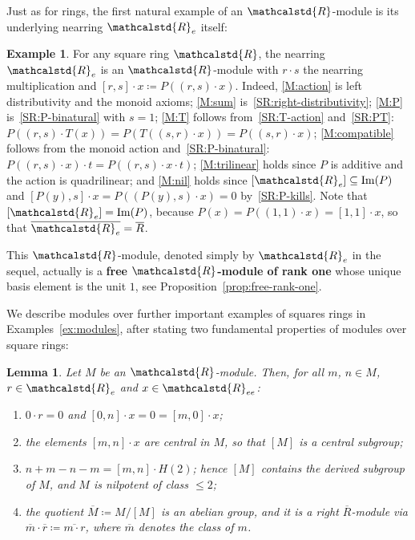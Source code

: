 \documentclass[reqno,a4paper]{amsart}
\theoremstyle{plain}
\newtheorem{lemma}[subsection]{Lemma}
\theoremstyle{definition}
\newtheorem{example}[subsection]{Example}
\newcommand{\defn}{\textbf}
\newcommand{\DefEq}{\coloneq}
\newcommand{\R}{\ensuremath{\mathcalstd{R}}}
\renewcommand{\Im}{\ensuremath{\mathrm{Im}}}
\renewcommand{\Re}{\ensuremath{\R_{e}}}
\newcommand{\Ree}{\ensuremath{\R_{ee}}}
\newcommand{\Rbar}{\ensuremath{\overline{R}}}
\newcommand{\brk}[2]{\ensuremath{[#1,#2]}}
\begin{document}
Just as for rings, the first natural example of an \(\R\)-module is its underlying nearring \(\R_e\) itself:

\begin{example}\label{ex:R_e}
  For any square ring \(\R\), the nearring \(\Re\) is an \(\R\)-module with \(r\cdot s\) the nearring multiplication and \(\brk{r}{s}\cdot x\DefEq P((r,s)\cdot x)\). Indeed, \ref{M:action} is left distributivity and the monoid axioms; \ref{M:sum} is~\ref{SR:right-distributivity}; \ref{M:P} is~\ref{SR:P-binatural} with \(s=1\); \ref{M:T} follows from~\ref{SR:T-action} and~\ref{SR:PT}: \(P((r,s)\cdot T(x))=P(T((s,r)\cdot x))=P((s,r)\cdot x)\); \ref{M:compatible} follows from the monoid action and~\ref{SR:P-binatural}: \(P((r,s)\cdot x)\cdot t=P((r,s)\cdot x\cdot t)\); \ref{M:trilinear} holds since \(P\) is additive and the action is quadrilinear; and \ref{M:nil} holds since \([\Re]\subseteq\Im(P)\) and \(\brk{P(y)}{s}\cdot x=P((P(y),s)\cdot x)=0\) by~\ref{SR:P-kills}. Note that \([\Re]=\Im(P)\), because \(P(x)=P((1,1)\cdot x)=\brk{1}{1}\cdot x\), so that \(\overline{\Re}=\Rbar\).

  This \(\R\)-module, denoted simply by \(\Re\) in the sequel, actually is a \defn{free \(\R\)-module of rank one} whose unique basis element is the unit \(1\), see Proposition~\ref{prop:free-rank-one}.
\end{example}

We describe modules over further important examples of squares rings in Examples~\ref{ex:modules}, after stating two fundamental properties of modules over square rings:

\begin{lemma}\label{lem:module-basic}
  Let \(M\) be an \(\R\)-module. Then, for all \(m\), \(n\in M\), \(r\in\Re\) and \(x\in\Ree\):
  \begin{enumerate}
    \item\label{it:zero} \(0\cdot r=0\) and \(\brk{0}{n}\cdot x=0=\brk{m}{0}\cdot x\);
    \item\label{it:central} the elements \(\brk{m}{n}\cdot x\) are central in \(M\), so that \([M]\) is a central subgroup;
    \item\label{it:commutator} \(n+m-n-m=\brk{m}{n}\cdot H(2)\); hence \([M]\) contains the derived subgroup of \(M\), and \(M\) is nilpotent of class \(\leq 2\);
    \item\label{it:quotient} the quotient \(\overline{M}\DefEq M/[M]\) is an abelian group, and it is a right \(\Rbar\)-module via \(\overline{m}\cdot\overline{r}\DefEq\overline{m\cdot r}\), where \(\overline{m}\) denotes the class of \(m\).
  \end{enumerate}
\end{lemma}
\end{document}

